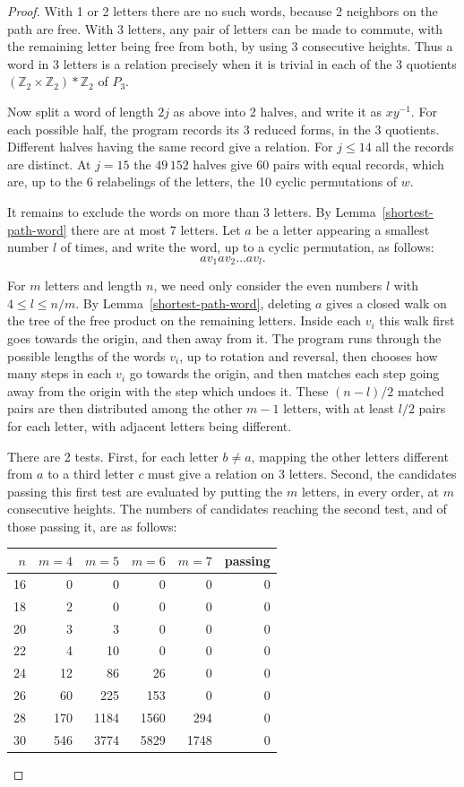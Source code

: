 \documentclass[11pt,a4paper]{article}
\begin{document}
\begin{proof}
With 1 or 2 letters there are no such words, because 2 neighbors on the path are free. With 3 letters, any pair of letters can be made to commute, with the remaining letter being free from both, by using 3 consecutive heights. Thus a word in 3 letters is a relation precisely when it is trivial in each of the 3 quotients $(\mathbb Z_2\times\mathbb Z_2)*\mathbb Z_2$ of $P_3$.

Now split a word of length $2j$ as above into 2 halves, and write it as $xy^{-1}$. For each possible half, the program records its 3 reduced forms, in the 3 quotients. Different halves having the same record give a relation. For $j\leq14$ all the records are distinct. At $j=15$ the $49\,152$ halves give $60$ pairs with equal records, which are, up to the 6 relabelings of the letters, the 10 cyclic permutations of $w$.

It remains to exclude the words on more than 3 letters. By Lemma~\ref{shortest-path-word} there are at most 7 letters. Let $a$ be a letter appearing a smallest number $l$ of times, and write the word, up to a cyclic permutation, as follows:
\[
 av_1av_2\ldots av_l.
\]

For $m$ letters and length $n$, we need only consider the even numbers $l$ with $4\leq l\leq n/m$. By Lemma~\ref{shortest-path-word}, deleting $a$ gives a closed walk on the tree of the free product on the remaining letters. Inside each $v_i$ this walk first goes towards the origin, and then away from it. The program runs through the possible lengths of the words $v_i$, up to rotation and reversal, then chooses how many steps in each $v_i$ go towards the origin, and then matches each step going away from the origin with the step which undoes it. These $(n-l)/2$ matched pairs are then distributed among the other $m-1$ letters, with at least $l/2$ pairs for each letter, with adjacent letters being different.

There are 2 tests. First, for each letter $b\neq a$, mapping the other letters different from $a$ to a third letter $c$ must give a relation on 3 letters. Second, the candidates passing this first test are evaluated by putting the $m$ letters, in every order, at $m$ consecutive heights. The numbers of candidates reaching the second test, and of those passing it, are as follows:
\begin{center}
\begin{tabular}{|r|r|r|r|r|r|}
\hline
$n$ & $m=4$ & $m=5$ & $m=6$ & $m=7$ & passing \\
\hline
16 & 0 & 0 & 0 & 0 & 0\\
\hline
18 & 2 & 0 & 0 & 0 & 0\\
\hline
20 & 3 & 3 & 0 & 0 & 0\\
\hline
22 & 4 & 10 & 0 & 0 & 0\\
\hline
24 & 12 & 86 & 26 & 0 & 0\\
\hline
26 & 60 & 225 & 153 & 0 & 0\\
\hline
28 & 170 & 1184 & 1560 & 294 & 0\\
\hline
30 & 546 & 3774 & 5829 & 1748 & 0\\
\hline
\end{tabular}
\end{center}


\end{proof}
\end{document}
